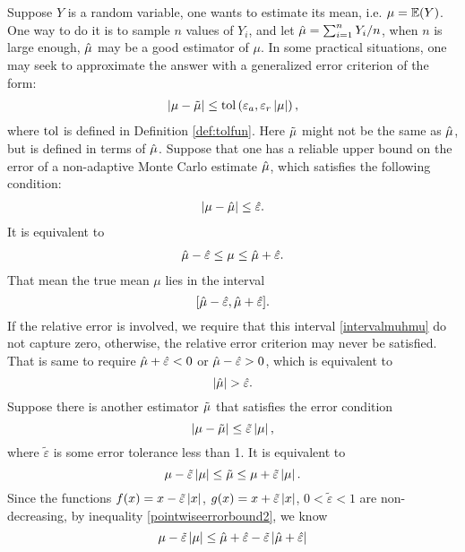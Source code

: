 \documentclass{iitthesis}
\theoremstyle{definition}
\begin{document}
 Suppose $Y$ is a random variable, one wants to estimate its mean, i.e. $\mu=\mathbb{E}(Y)$. One way to do it is to sample $n$ values of $Y_i$, and let $\hat{\mu}=\sum_{i=1}^n Y_i/n$, when $n$ is large enough, $\hat{\mu}$ may be a good estimator of $\mu$. In some practical situations, one may seek to approximate the answer with a generalized error criterion of the form:
\begin{align}\left \lvert \mu -\tilde{\mu} \right \rvert \leq \operatorname{tol} \left(\varepsilon_a,\varepsilon_r \left \lvert \mu \right \rvert\right),\label{pointwisegeneralizederror} 
\end{align}
where $\operatorname{tol}$ is defined in Definition \ref{def:tolfun}. Here $\tilde{\mu}$ might not be the same as $\hat{\mu}$, but is defined in terms of $\hat{\mu}$. Suppose that one has a reliable upper bound on the error of a non-adaptive Monte Carlo estimate $\hat{\mu}$, which satisfies the following condition:
\begin{align}
|\mu-\hat{\mu}| \leq \hat{\varepsilon}.  \label{pointwiseerrorbound} 
\end{align}
It is equivalent to 
\begin{align}
\hat{\mu} -\hat{\varepsilon} \leq \mu \leq \hat{\mu}+\hat{\varepsilon}.  \label{pointwiseerrorbound2} 
\end{align}
That mean the true mean $\mu$ lies in the interval 
\begin{equation}\label{intervalmuhmu}
[\hat{\mu} -\hat{\varepsilon}, \hat{\mu} +\hat{\varepsilon} ].
\end{equation}
If the relative error is involved, we require that this interval \eqref{intervalmuhmu} do not capture zero, otherwise, the relative error criterion may never be satisfied. That is same to require
$\hat{\mu} +\hat{\varepsilon}<0$ or $\hat{\mu} -\hat{\varepsilon}>0$, which is equivalent to  
\begin{equation} \label{hmuhepscondition}
\left \lvert \hat{\mu} \right \rvert > \hat{\varepsilon}.
\end{equation}
Suppose there is another estimator $\tilde{\mu}$ that satisfies the error condition
\begin{equation}\label{reltmu}
\left \lvert \mu-\tilde{\mu} \right \rvert \leq \tilde{\varepsilon}\left \lvert \mu \right \rvert,
\end{equation}
where $\tilde{\varepsilon}$ is some error tolerance less than 1.
It is equivalent to 
\begin{equation}
 \mu-\tilde{\varepsilon}\left \lvert \mu \right \rvert \leq \tilde{\mu} \leq \mu+\tilde{\varepsilon}\left \lvert \mu \right \rvert.
\end{equation}
Since the functions
$f(x) = x-\tilde{\varepsilon}\left \lvert x \right \rvert$, $g(x) = x+\tilde{\varepsilon}\left \lvert x \right \rvert$, $0<\tilde{\varepsilon} <1$ are non-decreasing, by inequality \eqref{pointwiseerrorbound2}, we know
$$\mu-\tilde{\varepsilon}\left \lvert \mu \right \rvert \leq \hat{\mu}+\hat{\varepsilon}-\tilde{\varepsilon}\left \lvert \hat{\mu}+\hat{\varepsilon} \right \rvert$$
\end{document}
